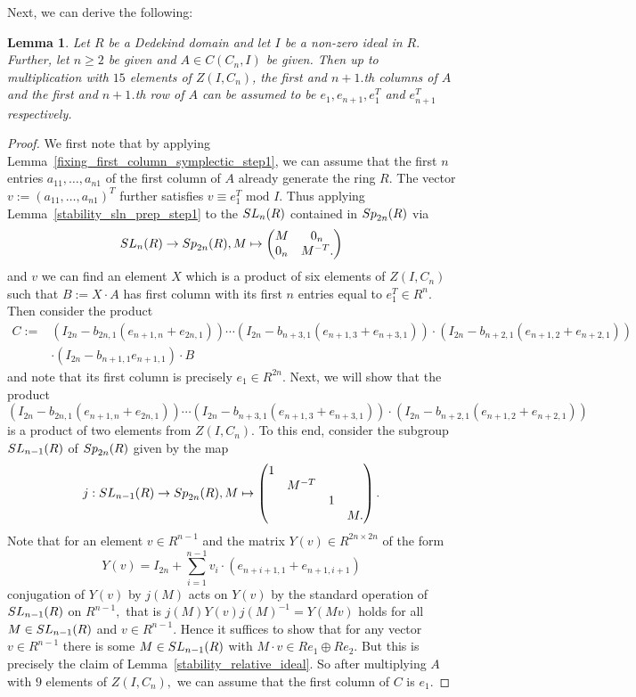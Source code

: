 \documentclass[12pt]{amsart}
\newtheorem{lemma}[theorem]{Lemma}
\theoremstyle{definition}\newtheorem{definition}[theorem]{Definition}
\theoremstyle{remark}\newtheorem{remark}[theorem]{Remark}
\theoremstyle{definition}\newtheorem{case}{Case}
\begin{document}
Next, we can derive the following:

\begin{lemma}\label{fixing_first_column_symplectic_step2}
Let $R$ be a Dedekind domain and let $I$ be a non-zero ideal in $R.$ Further, let $n\geq 2$ be given and $A\in C(C_n,I)$ be given. Then up to multiplication with $15$ elements of $Z(I,C_n)$, the first and $n+1.$th columns of $A$ and the first and $n+1$.th row of $A$ can be assumed to be $e_1, e_{n+1}, e_1^T$ and $e_{n+1}^T$ respectively. 
\end{lemma}

\begin{proof}
We first note that by applying Lemma~\ref{fixing_first_column_symplectic_step1}, we can assume that the first $n$ entries $a_{11},\dots,a_{n1}$ of the first column of $A$ already generate the ring $R.$ The vector $v:=(a_{11},\dots,a_{n1})^T$ further satisfies $v\equiv e_1^T\text{ 
 mod } I$. Thus applying Lemma~\ref{stability_sln_prep_step1} to the ${\rm SL}_n(R)$ contained in ${\rm Sp}_{2n}(R)$ via
\[
{\rm SL}_n(R)\to{\rm Sp}_{2n}(R),M\mapsto
\begin{pmatrix}
M & 0_n\\
0_n & M^{-T}.
\end{pmatrix}
\]
and $v$ we can find an element $X$ which is a product of six elements of $Z(I,C_n)$ such that $B:=X\cdot A$ has first column with its first $n$ entries equal to $e_1^T\in R^n.$ Then consider the product
\begin{align*}
C:=&(I_{2n}-b_{2n,1}(e_{n+1,n}+e_{2n,1}))\cdots(I_{2n}-b_{n+3,1}(e_{n+1,3}+e_{n+3,1}))\cdot(I_{2n}-b_{n+2,1}(e_{n+1,2}+e_{n+2,1}))\\
&\cdot(I_{2n}-b_{n+1,1}e_{n+1,1})\cdot B
\end{align*}
and note that its first column is precisely $e_1\in R^{2n}.$
Next, we will show that the product 
\[
(I_{2n}-b_{2n,1}(e_{n+1,n}+e_{2n,1}))\cdots(I_{2n}-b_{n+3,1}(e_{n+1,3}+e_{n+3,1}))\cdot(I_{2n}-b_{n+2,1}(e_{n+1,2}+e_{n+2,1}))
\]
is a product of two elements from $Z(I,C_n)$. To this end, consider the subgroup ${\rm SL}_{n-1}(R)$ of ${\rm Sp}_{2n}(R)$ given by the map
\[
j:{\rm SL}_{n-1}(R)\to{\rm Sp}_{2n}(R),M\mapsto
\begin{pmatrix}
1 & & &\\
& M^{-T} & & \\
& & 1 & \\
& & & M.
\end{pmatrix}.
\]
Note that for an element $v\in R^{n-1}$ and the matrix $Y(v)\in R^{2n\times 2n}$ of the form 
\[
Y(v)=I_{2n}+\sum_{i=1}^{n-1} v_i\cdot (e_{n+i+1,1}+e_{n+1,i+1})
\]
conjugation of $Y(v)$ by $j(M)$ acts on $Y(v)$ by the standard operation of ${\rm SL}_{n-1}(R)$ on $R^{n-1},$ that is $j(M)Y(v)j(M)^{-1}=Y(Mv)$ holds for all $M\in{\rm SL}_{n-1}(R)$ and $v\in R^{n-1}.$ Hence it suffices to show that for any vector $v\in R^{n-1}$ there is some $M\in{\rm SL}_{n-1}(R)$ with $M\cdot v\in Re_1\oplus Re_2.$ But this is precisely the claim of Lemma~\ref{stability_relative_ideal}. So after multiplying $A$ with $9$ elements of $Z(I,C_n),$ we can assume that the first column of $C$ is $e_1.$ 


\end{proof}
\end{document}
